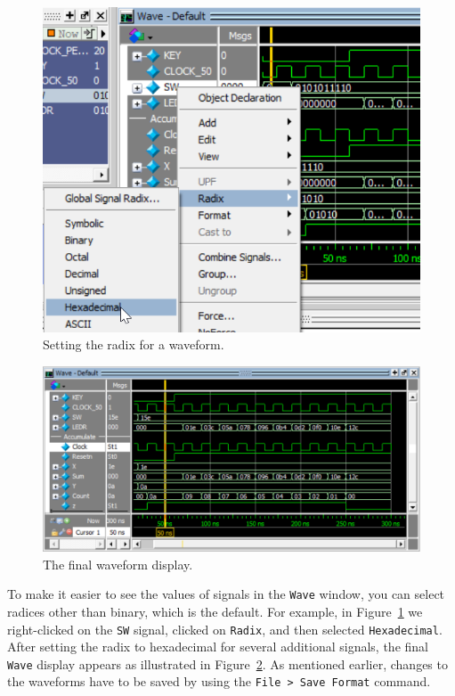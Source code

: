 \documentclass[11pt, twoside, pdftex]{article}
\begin{document}
\begin{figure}[h!]
	\begin{center}
		\includegraphics[scale=0.8]{figures/appa_fig12.png}
	\end{center}
		  \caption{Setting the radix for a waveform.}
	\label{fig:appa_fig12}
\end{figure}

\begin{figure}[h!]
	\begin{center}
		\includegraphics[scale=0.8]{figures/appa_fig13.png}
	\end{center}
		  \caption{The final waveform display.}
	\label{fig:appa_fig13}
\end{figure}

\clearpage
\noindent
To make it easier to see the values of signals in the \texttt{Wave} window, you can select
radices other than binary, which is the default. For example, in
Figure~\ref{fig:appa_fig12} we right-clicked on the \texttt{SW} signal, clicked on
\texttt{Radix}, and then selected \texttt{Hexadecimal}. After setting the radix to
hexadecimal for several additional signals, the final \texttt{Wave} display appears as
illustrated in Figure~\ref{fig:appa_fig13}. As mentioned earlier, changes to the waveforms
have to be saved by using the \texttt{File > Save Format} command.
\end{document}
